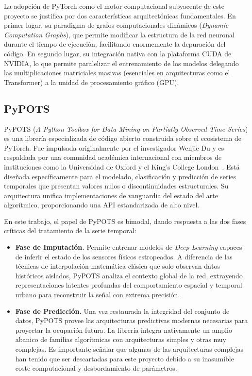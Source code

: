 La adopción de PyTorch como el motor computacional subyacente de este proyecto se justifica por dos características arquitectónicas fundamentales. En primer lugar, su paradigma de grafos computacionales dinámicos (\textit{Dynamic Computation Graphs}), que permite modificar la estructura de la red neuronal durante el tiempo de ejecución, facilitando enormemente la depuración del código. En segundo lugar, su integración nativa con la plataforma CUDA de NVIDIA, lo que permite paralelizar el entrenamiento de los modelos delegando las multiplicaciones matriciales masivas (esenciales en arquitecturas como el Transformer) a la unidad de procesamiento gráfico (GPU).

\subsection{PyPOTS}
\label{subsec:pypots}

PyPOTS (\textit{A Python Toolbox for Data Mining on Partially Observed Time Series}) es una librería especializada de código abierto construida sobre el ecosistema de PyTorch. Fue impulsada originalmente por el investigador Wenjie Du y es respaldada por una comunidad académica internacional con miembros de instituciones como la Universidad de Oxford y el King's College London~\cite{du2023pypots}. Está diseñada específicamente para el modelado, clasificación y predicción de series temporales que presentan valores nulos o discontinuidades estructurales. Su arquitectura unifica implementaciones de vanguardia del estado del arte algorítmico, proporcionando una API estandarizada de alto nivel.

En este trabajo, el papel de PyPOTS es bimodal, dando respuesta a las dos fases críticas del tratamiento de la serie temporal:

\begin{itemize}
	\item \textbf{Fase de Imputación.} Permite entrenar modelos de \textit{Deep Learning} capaces de inferir el estado de los sensores físicos estropeados. A diferencia de las técnicas de interpolación matemática clásica que solo observan datos históricos aislados, PyPOTS analiza el contexto global de la red, extrayendo representaciones latentes profundas del comportamiento espacial y temporal urbano para reconstruir la señal con extrema precisión.
	
	\item \textbf{Fase de Predicción.} Una vez restaurada la integridad del conjunto de datos, PyPOTS provee las arquitecturas predictivas modernas necesarias para proyectar la ocupación futura. La librería integra nativamente un amplio abanico de familias algorítmicas con arquitecturas simples y otras muy complejas. Es importante señalar que algunas de las arquitecturas complejas han tenido que ser descartadas para este proyecto debido a su inasumible coste computacional y desbordamiento de parámetros.
\end{itemize}

